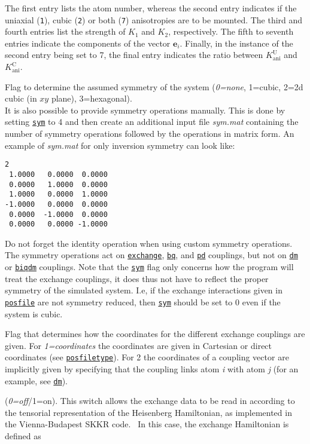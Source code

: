 \documentclass[11pt,fleqn,a4]{book} %
\makeatletter
\newcommand{\litem}[1]{\item[\bfseries#1\index{#1@\texttt{#1}}\label{#1}]}
\newcommand{\rkeyword}[1]{\hyperref[#1]{\texttt{#1}}}
\makeatother
\begin{document}
\begin{description}[leftmargin=!,labelwidth=\widthof{\bfseries fifteenchars}]
The first entry lists the atom number, whereas the second entry indicates if the uniaxial (\texttt{1}), cubic (\texttt{2}) or both (\texttt{7}) anisotropies are to be mounted. The third and fourth entries list the strength of $K_1$ and $K_2$, respectively. The fifth to seventh entries indicate the components of the vector $\mathbf{e}_i$. Finally, in the instance of the second entry being set to 7, the final entry indicates the ratio between  $K^{\mathrm{U}}_{\mathrm{ani}}$ and  $K^{\mathrm{C}}_{\mathrm{ani}}$.

\litem{sym} Flag to determine the assumed symmetry of the system (\emph{0=none}, 1=cubic, 2=2d cubic (in $xy$ plane), 3=hexagonal). \\
            It is also possible to provide symmetry operations manually. This is done by setting \rkeyword{sym} to 4 and then create an additional input file
             {\it sym.mat} containing the number of symmetry operations followed by the operations in matrix form. 
            An example of {\it sym.mat} for only inversion symmetry can look like: 
\begin{fBox} 
\begin{Verbatim}
2 
 1.0000   0.0000  0.0000
 0.0000   1.0000  0.0000
 1.0000   0.0000  1.0000
-1.0000   0.0000  0.0000
 0.0000  -1.0000  0.0000
 0.0000   0.0000 -1.0000
\end{Verbatim}
\end{fBox}
        Do not forget the identity operation when using custom symmetry operations. The symmetry operations act on \rkeyword{exchange}, \rkeyword{bq}, and \rkeyword{pd} couplings, but not on \rkeyword{dm} or \rkeyword{biqdm} couplings. Note that the \rkeyword{sym} flag only concerns how the program will treat the exchange couplings, it does thus not have to reflect the proper symmetry of the simulated system. I.e, if the exchange interactions given in \rkeyword{posfile} are not symmetry reduced, then \rkeyword{sym} should be set to $0$ even if the system is cubic.
\litem{maptype} Flag that determines how the coordinates for the different exchange couplings are given. For \emph{1=coordinates} the coordinates are given in Cartesian or direct coordinates (see \rkeyword{posfiletype}). For 2 the coordinates of a coupling vector are implicitly given by specifying that the coupling links atom \textit{i} with atom \textit{j} (for an example, see \rkeyword{dm}).
\litem{do_jtensor} (\emph{0=off}/1=on). This switch allows the exchange data to be read in according to the tensorial representation of the Heisenberg Hamiltonian, as implemented in the Vienna-Budapest SKKR code.~\cite{Udvardi2003} In this case, the exchange Hamiltonian is defined as


\end{description}
\end{document}
